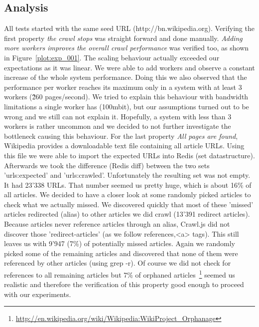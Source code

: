 \subsection{Analysis}

All tests started with the same seed URL (http://bn.wikipedia.org). Verifying the first property \emph{the crawl stops} was straight forward and done manually. \emph{Adding more workers improves the overall crawl performance} was verified too, as shown in Figure~\ref{plot:exp_001}. The scaling behaviour actually exceeded our expectations as it was linear. We were able to add workers and observe a constant increase of the whole system performance. Doing this we also observed that the performance per worker reaches its maximum only in a system with at least 3 workers (\~260 pages/second). We tried to explain this behaviour with bandwidth limitations a single worker has (100mbit), but our assumptions turned out to be wrong and we still can not explain it. Hopefully, a system with less than 3 workers is rather uncommon and we decided to not further investigate the bottleneck causing this behaviour.
\newline
\newline
For the last property \emph{All pages are found}, Wikipedia provides a downloadable text file containing all article URLs. Using this file we were able to import the expected URLs into Redis (set datastructure). Afterwards we took the difference (Redis diff) between the two sets 'urls:expected' and 'urls:crawled'. Unfortunately the resulting set was not empty. It had 23'338 URLs. That number seemed us pretty huge, which is about 16\% of all articles. We decided to have a closer look at some randomly picked articles to check what we actually missed. We discovered quickly that most of these 'missed' articles redirected (alias) to other articles we did crawl (13'391 redirect articles). Because articles never reference articles through an alias, Crawl.js did not discover those 'redirect-articles' (as we follow references,<a> tags). This still leaves us with 9'947 (7\%) of potentially missed articles. Again we randomly picked some of the remaining articles and discovered that none of them were referenced by other articles (using grep -r). Of course we did not check for references to all remaining articles but 7\% of orphaned articles~\footnote{\url{http://en.wikipedia.org/wiki/Wikipedia:WikiProject_Orphanage}} seemed us realistic and therefore the verification of this property good enough to proceed with our experiments.
\newline
